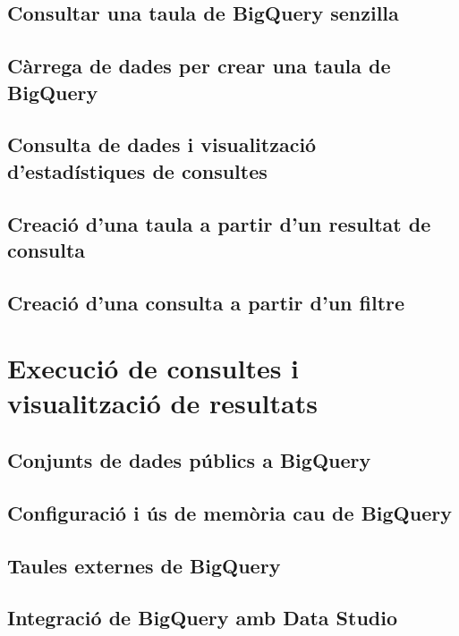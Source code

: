 \documentclass[12pt,longbibliography]{article}
\theoremstyle{definition}
\theoremstyle{remark}
\begin{document}
\subsection{Consultar una taula de BigQuery senzilla}

\subsection{Càrrega de dades per crear una taula de BigQuery}

\subsection{Consulta de dades i visualització d'estadístiques de consultes}

\subsection{Creació d'una taula a partir d'un resultat de consulta}

\subsection{Creació d'una consulta a partir d'un filtre}

\newpage

\section{Execució de consultes i visualització de resultats}

\subsection{Conjunts de dades públics a BigQuery}

\subsection{Configuració i ús de memòria cau de BigQuery}

\subsection{Taules externes de BigQuery}

\subsection{Integració de BigQuery amb Data Studio}

\newpage
\end{document}
